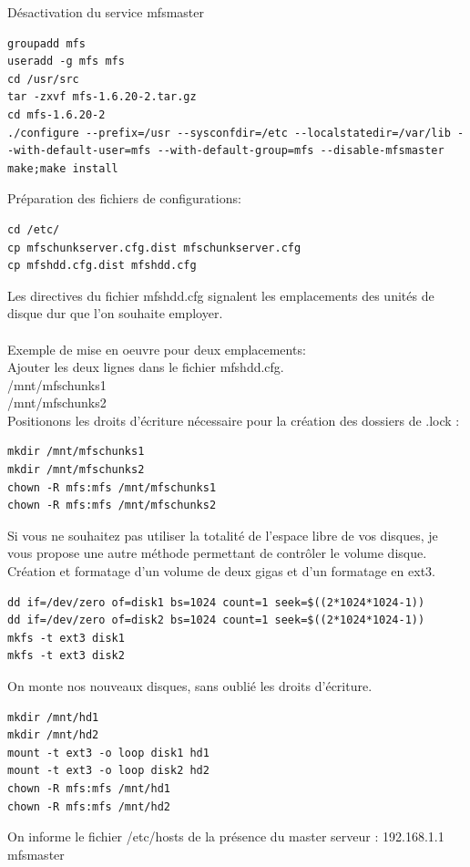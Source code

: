 \documentclass[12pt]{report}
\begin{document}
Désactivation du service mfsmaster\\
  \begin{lstlisting}
groupadd mfs
useradd -g mfs mfs
cd /usr/src
tar -zxvf mfs-1.6.20-2.tar.gz
cd mfs-1.6.20-2
./configure --prefix=/usr --sysconfdir=/etc --localstatedir=/var/lib --with-default-user=mfs --with-default-group=mfs --disable-mfsmaster
make;make install
	  \end{lstlisting}
Préparation des fichiers de configurations:\\
  \begin{lstlisting}
cd /etc/
cp mfschunkserver.cfg.dist mfschunkserver.cfg
cp mfshdd.cfg.dist mfshdd.cfg
	  \end{lstlisting}
Les directives du fichier mfshdd.cfg signalent les emplacements des unités de disque dur que l'on souhaite employer.\\\\
Exemple de mise en oeuvre pour deux emplacements:\\
Ajouter les deux lignes dans le fichier mfshdd.cfg.\\
/mnt/mfschunks1\\
/mnt/mfschunks2\\
Positionons les droits d'écriture nécessaire pour la création des dossiers de .lock :\\
  \begin{lstlisting}
mkdir /mnt/mfschunks1
mkdir /mnt/mfschunks2
chown -R mfs:mfs /mnt/mfschunks1
chown -R mfs:mfs /mnt/mfschunks2
	  \end{lstlisting}
Si vous ne souhaitez pas utiliser la totalité de l'espace libre de vos disques, je vous propose une autre méthode permettant de contrôler le volume disque.\\
Création et formatage d'un volume de deux gigas et d'un formatage en ext3.\\
  \begin{lstlisting}
dd if=/dev/zero of=disk1 bs=1024 count=1 seek=$((2*1024*1024-1))
dd if=/dev/zero of=disk2 bs=1024 count=1 seek=$((2*1024*1024-1))
mkfs -t ext3 disk1
mkfs -t ext3 disk2
	  \end{lstlisting}
On monte nos nouveaux disques, sans oublié les droits d'écriture.\\
  \begin{lstlisting}
mkdir /mnt/hd1
mkdir /mnt/hd2
mount -t ext3 -o loop disk1 hd1
mount -t ext3 -o loop disk2 hd2
chown -R mfs:mfs /mnt/hd1
chown -R mfs:mfs /mnt/hd2
	  \end{lstlisting}
On informe le fichier /etc/hosts de la présence du master serveur : 192.168.1.1 mfsmaster\\
\end{document}

